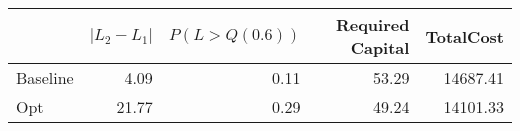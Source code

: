 \begin{tabular}{lrrrr}
\toprule
{} &  $|L_2 - L_1|$ &  $P(L > Q(0.6))$ &  Required Capital &  TotalCost \\
\midrule
Baseline &           4.09 &             0.11 &             53.29 &   14687.41 \\
Opt      &          21.77 &             0.29 &             49.24 &   14101.33 \\
\bottomrule
\end{tabular}
